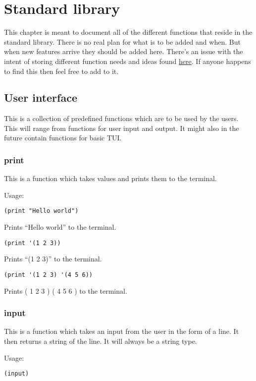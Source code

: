 
\section{Standard library}

This chapter is meant to document all of the different functions that reside in the standard library. 
There is no real plan for what is to be added and when. 
But when new features arrive they should be added here. 
There's an issue with the intent of storing different function needs and ideas found \href{https://github.com/AntonJoha/Lisp/issues/11}{here}.
If anyone happens to find this then feel free to add to it. 


\subsection{User interface}

This is a collection of predefined functions which are to be used by the users. 
This will range from functions for user input and output. 
It might also in the future contain functions for basic TUI. 


\subsubsection{print}

This is a function which takes values and prints them to the terminal.

Usage:
\begin{lstlisting}
(print "Hello world")
\end{lstlisting}
Prints ``Hello world'' to the terminal.
\begin{lstlisting}
(print '(1 2 3))
\end{lstlisting}
Prints ``(1 2 3)'' to the terminal.
\begin{lstlisting}
(print '(1 2 3) '(4 5 6))
\end{lstlisting}
Prints ( 1 2 3 ) ( 4 5 6 ) to the terminal.

\subsubsection{input}

This is a function which takes an input from the user in the form of a line. 
It then returns a string of the line. 
It will always be a string type.

Usage:
\begin{lstlisting}
(input)
\end{lstlisting}

